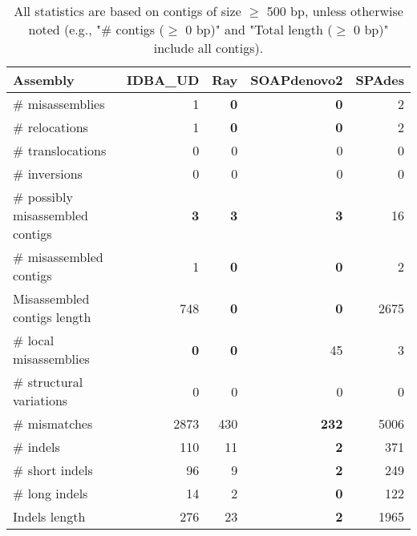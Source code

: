 \documentclass[12pt,a4paper]{article}
\begin{document}
\begin{table}[ht]
\begin{center}
\caption{All statistics are based on contigs of size $\geq$ 500 bp, unless otherwise noted (e.g., "\# contigs ($\geq$ 0 bp)" and "Total length ($\geq$ 0 bp)" include all contigs).}
\begin{tabular}{|l*{4}{|r}|}
\hline
Assembly & IDBA\_UD & Ray & SOAPdenovo2 & SPAdes \\ \hline
\# misassemblies & 1 & {\bf 0} & {\bf 0} & 2 \\ \hline
\hspace{5mm}\# relocations & 1 & {\bf 0} & {\bf 0} & 2 \\ \hline
\hspace{5mm}\# translocations & 0 & 0 & 0 & 0 \\ \hline
\hspace{5mm}\# inversions & 0 & 0 & 0 & 0 \\ \hline
\# possibly misassembled contigs & {\bf 3} & {\bf 3} & {\bf 3} & 16 \\ \hline
\# misassembled contigs & 1 & {\bf 0} & {\bf 0} & 2 \\ \hline
Misassembled contigs length & 748 & {\bf 0} & {\bf 0} & 2675 \\ \hline
\# local misassemblies & {\bf 0} & {\bf 0} & 45 & 3 \\ \hline
\# structural variations & 0 & 0 & 0 & 0 \\ \hline
\# mismatches & 2873 & 430 & {\bf 232} & 5006 \\ \hline
\# indels & 110 & 11 & {\bf 2} & 371 \\ \hline
\hspace{5mm}\# short indels & 96 & 9 & {\bf 2} & 249 \\ \hline
\hspace{5mm}\# long indels & 14 & 2 & {\bf 0} & 122 \\ \hline
Indels length & 276 & 23 & {\bf 2} & 1965 \\ \hline
\end{tabular}
\end{center}
\end{table}
\end{document}
